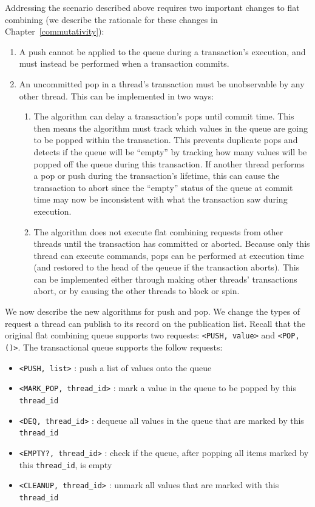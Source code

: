 Addressing the scenario described above requires two important changes to flat combining (we describe the rationale for these changes in Chapter~\ref{commutativity}): 
\begin{enumerate}
\item A push cannot be applied to the queue during a transaction's execution, and must instead be performed when a transaction commits.
\item An uncommitted pop in a thread's transaction must be unobservable by any other thread. This can be implemented in two ways:  
    \begin{enumerate}
        \item The algorithm can delay a transaction's pops until commit time. This then means the algorithm must track which values in the queue are going to be popped within the transaction. This prevents duplicate pops and detects if the queue will be ``empty'' by tracking how many values will be popped off the queue during this transaction. If another thread performs a pop or push during the transaction's lifetime, this can cause the transaction to abort since the ``empty'' status of the queue at commit time may now be inconsistent with what the transaction saw during execution. 
        \item The algorithm does not execute flat combining requests from other threads until the transaction has committed or aborted. Because only this thread can execute commands, pops can be performed at execution time (and restored to the head of the qeueue if the transaction aborts). This can be implemented either through making other threads' transactions abort, or by causing the other threads to block or spin.
    \end{enumerate}
\end{enumerate}

We now describe the new algorithms for push and pop.  We change the types of request a thread can publish to its record on the publication list. Recall that the original flat combining queue supports two requests: \texttt{<PUSH, value>} and \texttt{<POP, ()>}. The transactional queue supports the follow requests:
\begin{itemize}
    \item \texttt{<PUSH, list>} : push a list of values onto the queue
    \item \texttt{<MARK\_POP, thread\_id>} : mark a value in the queue to be popped by this \texttt{thread\_id}
    \item \texttt{<DEQ, thread\_id>} : dequeue all values in the queue that are marked by this \texttt{thread\_id}
    \item \texttt{<EMPTY?, thread\_id>} : check if the queue, after popping all items marked by this \texttt{thread\_id}, is empty
    \item \texttt{<CLEANUP, thread\_id>} : unmark all values that are marked with this \texttt{thread\_id}
\end{itemize}

